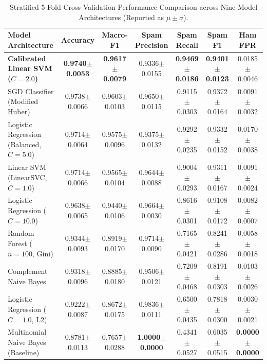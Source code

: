 \documentclass[9.5pt,twocolumn,letterpaper]{article}
\begin{document}
\begin{table}[t]
\centering
\footnotesize
\setlength{\tabcolsep}{3.5pt}
\renewcommand{\arraystretch}{1.06}
\begin{tabular*}{\textwidth}{@{\extracolsep{\fill}}l c c c c c c@{}}
\toprule
\textbf{Model Architecture} & \textbf{Accuracy} & \textbf{Macro-F1} & \textbf{Spam Precision} & \textbf{Spam Recall} & \textbf{Spam F1} & \textbf{Ham FPR} \\
\midrule
\textbf{Calibrated Linear SVM ($C=2.0$)} & \textbf{0.9740$\pm$0.0053} & \textbf{0.9617$\pm$0.0079} & 0.9336$\pm$0.0155 & \textbf{0.9469$\pm$0.0186} & \textbf{0.9401$\pm$0.0123} & 0.0185$\pm$0.0046 \\
SGD Classifier (Modified Huber) & 0.9738$\pm$0.0066 & 0.9603$\pm$0.0103 & 0.9650$\pm$0.0115 & 0.9115$\pm$0.0303 & 0.9372$\pm$0.0164 & 0.0091$\pm$0.0032 \\
Logistic Regression (Balanced, $C=5.0$) & 0.9714$\pm$0.0064 & 0.9575$\pm$0.0096 & 0.9375$\pm$0.0132 & 0.9292$\pm$0.0235 & 0.9332$\pm$0.0152 & 0.0170$\pm$0.0038 \\
Linear SVM (LinearSVC, $C=1.0$) & 0.9714$\pm$0.0066 & 0.9565$\pm$0.0104 & 0.9644$\pm$0.0088 & 0.9004$\pm$0.0293 & 0.9311$\pm$0.0167 & 0.0091$\pm$0.0024 \\
Logistic Regression ($C=10.0$) & 0.9638$\pm$0.0065 & 0.9440$\pm$0.0106 & 0.9664$\pm$0.0030 & 0.8616$\pm$0.0301 & 0.9108$\pm$0.0172 & 0.0082$\pm$0.0007 \\
Random Forest ($n=100$, Gini) & 0.9344$\pm$0.0093 & 0.8919$\pm$0.0170 & 0.9714$\pm$0.0090 & 0.7165$\pm$0.0421 & 0.8241$\pm$0.0286 & 0.0058$\pm$0.0018 \\
Complement Naive Bayes & 0.9318$\pm$0.0096 & 0.8885$\pm$0.0180 & 0.9506$\pm$0.0121 & 0.7209$\pm$0.0468 & 0.8191$\pm$0.0303 & 0.0103$\pm$0.0026 \\
Logistic Regression ($C=1.0$, L2) & 0.9222$\pm$0.0087 & 0.8672$\pm$0.0175 & 0.9836$\pm$0.0111 & 0.6500$\pm$0.0435 & 0.7818$\pm$0.0300 & 0.0030$\pm$0.0021 \\
Multinomial Naive Bayes (Baseline) & 0.8781$\pm$0.0113 & 0.7657$\pm$0.0288 & \textbf{1.0000$\pm$0.0000} & 0.4341$\pm$0.0527 & 0.6035$\pm$0.0515 & \textbf{0.0000$\pm$0.0000} \\
\bottomrule
\end{tabular*}
\caption{Stratified 5-Fold Cross-Validation Performance Comparison across Nine Model Architectures (Reported as $\mu \pm \sigma$).}
\label{tab:spam_benchmark}
\end{table}
\end{document}
